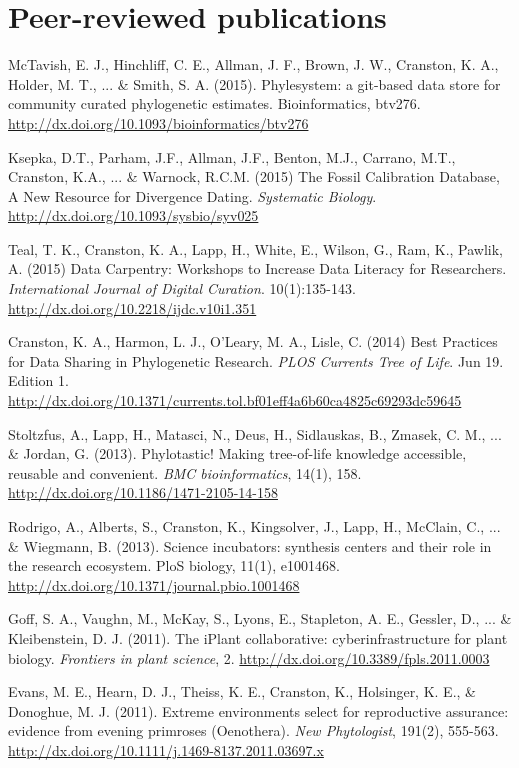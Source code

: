 \documentclass[10pt]{article}
\begin{document}
\section*{Peer-reviewed publications}

McTavish, E. J., Hinchliff, C. E., Allman, J. F., Brown, J. W., Cranston, K. A., Holder, M. T., ... \& Smith, S. A. (2015). Phylesystem: a git-based data store for community curated phylogenetic estimates. Bioinformatics, btv276. \url{http://dx.doi.org/10.1093/bioinformatics/btv276}

Ksepka, D.T., Parham, J.F., Allman, J.F., Benton, M.J., Carrano, M.T., Cranston, K.A., ... \& Warnock, R.C.M. (2015) The Fossil Calibration Database, A New Resource for Divergence Dating. \textit{Systematic Biology}. \url{http://dx.doi.org/10.1093/sysbio/syv025}

Teal, T. K., Cranston, K. A., Lapp, H., White, E., Wilson, G., Ram, K., Pawlik, A. (2015) Data Carpentry: Workshops to Increase Data Literacy for Researchers. \textit{International Journal of Digital Curation}. 10(1):135-143. \url{http://dx.doi.org/10.2218/ijdc.v10i1.351}
 
Cranston, K. A., Harmon, L. J., O'Leary, M. A., Lisle, C. (2014) Best Practices for Data Sharing in Phylogenetic Research. \textit{PLOS Currents Tree of Life}. Jun 19. Edition 1. \url{http://dx.doi.org/10.1371/currents.tol.bf01eff4a6b60ca4825c69293dc59645} 

Stoltzfus, A., Lapp, H., Matasci, N., Deus, H., Sidlauskas, B., Zmasek, C. M., ... \& Jordan, G. (2013). Phylotastic! Making tree-of-life knowledge accessible, reusable and convenient. \textit{BMC bioinformatics}, 14(1), 158. \url{http://dx.doi.org/10.1186/1471-2105-14-158} 

Rodrigo, A., Alberts, S., Cranston, K., Kingsolver, J., Lapp, H., McClain, C., ... \& Wiegmann, B. (2013). Science incubators: synthesis centers and their role in the research ecosystem. PloS biology, 11(1), e1001468. \url{http://dx.doi.org/10.1371/journal.pbio.1001468} 

Goff, S. A., Vaughn, M., McKay, S., Lyons, E., Stapleton, A. E., Gessler, D., ... \& Kleibenstein, D. J. (2011). The iPlant collaborative: cyberinfrastructure for plant biology. \textit{Frontiers in plant science}, 2. \url{http://dx.doi.org/10.3389/fpls.2011.0003} 

Evans, M. E., Hearn, D. J., Theiss, K. E., Cranston, K., Holsinger, K. E., \& Donoghue, M. J. (2011). Extreme environments select for reproductive assurance: evidence from evening primroses (Oenothera). \textit{New Phytologist}, 191(2), 555-563. \url{http://dx.doi.org/10.1111/j.1469-8137.2011.03697.x} 
\end{document}
